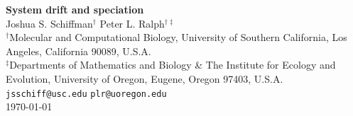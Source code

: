 \documentclass{article}
\newcommand{\1}{\mathbbm{1}}
\begin{document}

{\centering
{\Huge \bf System drift and speciation} \\ \vspace{0.75cm}
Joshua S. Schiffman$^{\dagger}$ \qquad Peter L. Ralph$^{\dagger \ddagger}$ \\ \vspace{0.5cm}
$^{\dagger}${\footnotesize {Molecular and Computational Biology, University of Southern California, Los Angeles, California 90089, U.S.A. \\
$^{\ddagger}$Departments of Mathematics and Biology \& The Institute for Ecology and Evolution, University of Oregon, Eugene, Oregon 97403, U.S.A.}} \\ \vspace{0.5cm}
{\small \texttt{jsschiff@usc.edu} \qquad 
\texttt{plr@uoregon.edu}} \\ \vspace{0.5cm}
\small \today \\
\vspace{0.25cm}
}

%
%
%
%
%
%
%
%
%
%
%
%
%
%
%
\end{document}
